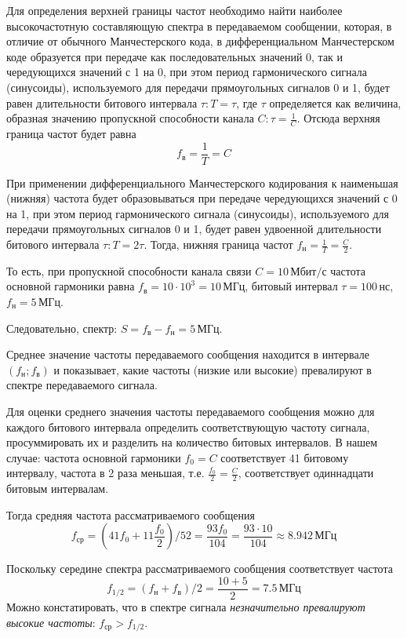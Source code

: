 Для определения верхней границы частот необходимо найти наиболее высокочастотную составляющую спектра в передаваемом сообщении, которая, в отличие от обычного Манчестерского кода, в дифференциальном Манчестерском коде образуется при передаче как последовательных значений 0, так и чередующихся значений с 1 на 0, при этом период гармонического сигнала (синусоиды), используемого для передачи прямоугольных сигналов 0 и 1, будет равен длительности битового интервала $\tau: T = \tau$, где $\tau$ определяется как величина, образная значению пропускной способности канала $C: \tau = \frac{1}{C}$. Отсюда верхняя граница частот будет равна \[f_{\text{в}} = \frac{1}{T} = C\]

При применении дифференциального Манчестерского кодирования к наименьшая (нижняя) частота будет образовываться при передаче чередующихся значений с 0 на 1, при этом период гармонического сигнала (синусоиды), используемого для передачи прямоугольных сигналов 0 и 1, будет равен удвоенной длительности битового интервала $\tau: T = 2\tau$. Тогда, нижняя граница частот $f_{\text{н}} = \frac{1}{T} = \frac{C}{2}$.

То есть, при пропускной способности канала связи $C = 10 \, \text{Мбит/с}$ частота основной гармоники равна $f_{\text{в}} = 10 \cdot 10^3 = 10 \, \text{МГц}$, битовый интервал $\tau = 100 \, \text{нс}$, $f_{\text{н}} = 5 \, \text{МГц}$.

Следовательно, спектр: $S = f_{\text{в}} - f_{\text{н}} = 5 \, \text{МГц}$.

Среднее значение частоты передаваемого сообщения находится в интервале $(f_{\text{н}};f_{\text{в}})$ и показывает, какие частоты (низкие или высокие) превалируют в спектре передаваемого сигнала.

Для оценки среднего значения частоты передаваемого сообщения можно для каждого битового интервала определить соответствующую частоту сигнала, просуммировать их и разделить на количество битовых интервалов. В нашем случае: частота основной гармоники $f_0 = C$ соответствует 41 битовому интервалу, частота в 2 раза меньшая, т.е. $\frac{f_0}{2} = \frac{C}{2}$, соответствует одиннадцати битовым интервалам.

Тогда средняя частота рассматриваемого сообщения
\[
	f_{\text{ср}} = \left(41f_0+11\frac{f_0}{2}\right)/ 52 = \frac{93f_0}{104} = \frac{93 \cdot 10}{104} \approx 8.942 \, \text{МГц}
\]

Поскольку середине спектра рассматриваемого сообщения соответствует частота
\[
	f_{1/2} = (f_{\text{н}} + f_{\text{в}}) /2 = \frac{10 + 5}{2} = 7.5 \, \text{МГц}
\]
Можно констатировать, что в спектре сигнала \textit{незначительно превалируют высокие частоты}: $f_{\text{ср}} > f_{1/2}$.


